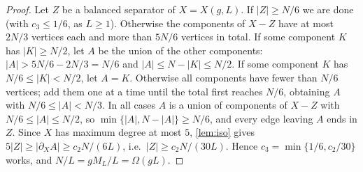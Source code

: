\documentclass[11pt,a4paper]{article}
\theoremstyle{plain}
\theoremstyle{definition}
\theoremstyle{remark}
\begin{document}
\label{pf:sep}
\corsep*
\begin{proof}
Let $Z$ be a balanced separator of $X=X(g,L)$. If $|Z|\ge N/6$ we are done (with $c_3\le1/6$, as $L\ge1$). Otherwise the components of $X-Z$ have at most $2N/3$ vertices each and more than $5N/6$ vertices in total. If some component $K$ has $|K|\ge N/2$, let $A$ be the union of the other components: $|A|>5N/6-2N/3=N/6$ and $|A|\le N-|K|\le N/2$. If some component $K$ has $N/6\le|K|<N/2$, let $A=K$. Otherwise all components have fewer than $N/6$ vertices; add them one at a time until the total first reaches $N/6$, obtaining $A$ with $N/6\le|A|<N/3$. In all cases $A$ is a union of components of $X-Z$ with $N/6\le|A|\le N/2$, so $\min\{|A|,N-|A|\}\ge N/6$, and every edge leaving $A$ ends in $Z$. Since $X$ has maximum degree at most $5$, \cref{lem:iso} gives $5|Z|\ge|\partial_XA|\ge c_2N/(6L)$, i.e.\ $|Z|\ge c_2N/(30L)$. Hence $c_3=\min\{1/6,c_2/30\}$ works, and $N/L=gM_L/L=\Omega(gL)$.
\end{proof}
\end{document}

